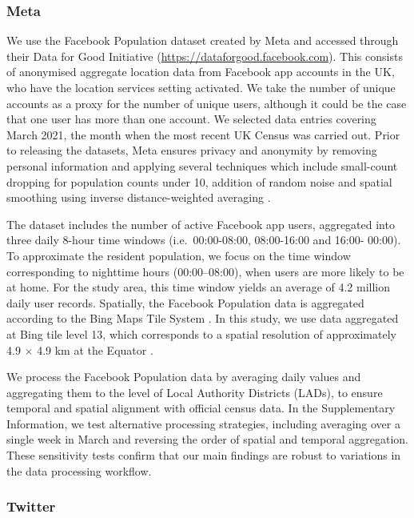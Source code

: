 \documentclass[]{rsos}%
\begin{document}
\subsubsection{Meta}\label{meta}

We use the Facebook Population dataset created by Meta and accessed
through their Data for Good Initiative
(\url{https://dataforgood.facebook.com}). This consists of anonymised
aggregate location data from Facebook app accounts in the UK, who have
the location services setting activated. We take the number of unique
accounts as a proxy for the number of unique users, although it could be
the case that one user has more than one account. We selected data
entries covering March 2021, the month when the most recent UK Census
was carried out. Prior to releasing the datasets, Meta ensures privacy
and anonymity by removing personal information and applying several
techniques which include small-count dropping for population counts
under 10, addition of random noise and spatial smoothing using inverse
distance-weighted averaging \citep{maas2019}.

The dataset includes the number of active Facebook app users, aggregated
into three daily 8-hour time windows (i.e.~00:00-08:00, 08:00-16:00 and
16:00- 00:00). To approximate the resident population, we focus on the
time window corresponding to nighttime hours (00:00--08:00), when users
are more likely to be at home. For the study area, this time window
yields an average of 4.2 million daily user records. Spatially, the
Facebook Population data is aggregated according to the Bing Maps Tile
System \citep{bingmaps_tile_system}. In this study, we use data aggregated at
Bing tile level 13, which corresponds to a spatial resolution of
approximately 4.9 \(\times\) 4.9 km at the Equator \citep{maas2019}.

We process the Facebook Population data by averaging daily values and
aggregating them to the level of Local Authority Districts (LADs), to
ensure temporal and spatial alignment with official census data. In the
Supplementary Information, we test alternative processing strategies,
including averaging over a single week in March and reversing the order
of spatial and temporal aggregation. These sensitivity tests confirm
that our main findings are robust to variations in the data processing
workflow.

\subsubsection{Twitter}\label{twitter}
\end{document}
